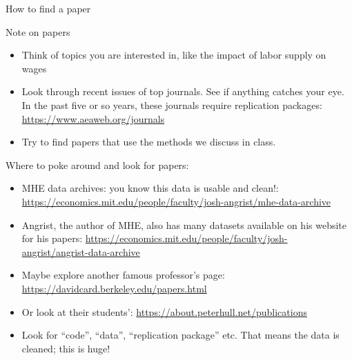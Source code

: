 \documentclass[compress, 8pt]{beamer}
\begin{document}
\begin{frame}{How to find a paper}

Note on papers
\begin{itemize}
    \item Think of topics you are interested in, like the impact of labor supply on wages
    \item Look through recent issues of top journals. See if anything catches your eye. In the past five or so years, these journals require replication packages: \url{https://www.aeaweb.org/journals}

    \item Try to find papers that use the methods we discuss in class.
\end{itemize}

\vspace{2ex}
Where to poke around and look for papers:
\begin{itemize}
    \item MHE data archives: you know this data is usable and clean!: \url{https://economics.mit.edu/people/faculty/josh-angrist/mhe-data-archive}
    \item Angrist, the author of MHE, also has many datasets available on his website for his papers: \url{https://economics.mit.edu/people/faculty/josh-angrist/angrist-data-archive}
    \item Maybe explore another famous professor's page: \url{https://davidcard.berkeley.edu/papers.html}
    \item Or look at their students’: \url{https://about.peterhull.net/publications}
    \item Look for ``code'', ``data'', ``replication package'' etc. That means the data is cleaned; this is huge!

\end{itemize}


\end{frame}
\end{document}
